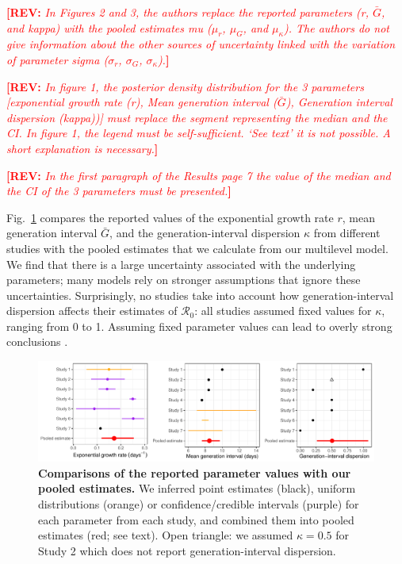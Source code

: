 \documentclass[12pt]{article}
\newcommand{\fref}[1]{Fig.~\ref{fig:#1}}
\newcommand{\Ro}{\ensuremath{{\mathcal R}_{0}}\xspace}
\newcommand{\comment}[3]{\textcolor{#1}{\textbf{[#2: }\textsl{#3}\textbf{]}}}
\newcommand{\rev}[1]{\comment{red}{REV}{#1}}
\begin{document}
\rev{In Figures 2 and 3, the authors replace the reported parameters (r, $\bar G$, and kappa) with the
pooled estimates mu ($\mu_r$, $\mu_G$, and $\mu_\kappa$). The authors do not give information about
the other sources of uncertainty linked with the variation of parameter sigma ($\sigma_r$, $\sigma_G$,
$\sigma_\kappa$).}

\rev{In figure 1, the posterior density distribution for the 3 parameters [exponential growth rate (r),
Mean generation interval ($\bar G$), Generation interval dispersion (kappa))] must replace the
segment representing the median and the CI. In figure 1, the legend must be self-sufficient. ‘See
text’ it is not possible. A short explanation is necessary.}

\rev{In the first paragraph of the Results page 7 the value of the median and the CI of the 3
parameters must be presented.}

\fref{assumption} compares the reported values of the exponential growth rate $r$, mean generation interval $\bar G$, and the generation-interval dispersion $\kappa$ from different studies with the pooled estimates that we calculate from our multilevel model.
We find that there is a large uncertainty associated with the underlying parameters;
many models rely on stronger assumptions that ignore these uncertainties.
Surprisingly, no studies take into account how generation-interval dispersion affects their estimates of \Ro:
all studies assumed fixed values for $\kappa$, ranging from 0 to 1.
Assuming fixed parameter values can lead to overly strong conclusions \citep{elderd2006uncertainty}.

\begin{figure}[t]
\includegraphics[width=\textwidth]{compare_assumption.pdf}
\caption{
\textbf{Comparisons of the reported parameter values with our pooled estimates.}
We inferred point estimates (black), uniform distributions (orange) or confidence/credible intervals (purple) for each parameter from each study, and combined them into pooled estimates (red; see text).
Open triangle: we assumed $\kappa=0.5$ for Study 2 which does not report generation-interval dispersion.
}
\label{fig:assumption}
\end{figure}
\end{document}
